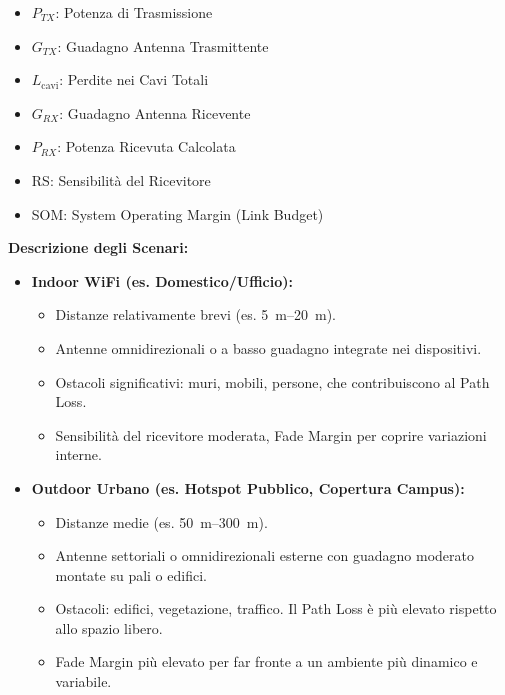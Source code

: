\begin{itemize}
    \item $P_{TX}$: Potenza di Trasmissione
    \item $G_{TX}$: Guadagno Antenna Trasmittente
    \item $L_{\text{cavi}}$: Perdite nei Cavi Totali
    \item $G_{RX}$: Guadagno Antenna Ricevente
    \item $P_{RX}$: Potenza Ricevuta Calcolata
    \item RS: Sensibilità del Ricevitore
    \item SOM: System Operating Margin (Link Budget)
\end{itemize}

\textbf{Descrizione degli Scenari:}
\begin{itemize}
    \item \textbf{Indoor WiFi (es. Domestico/Ufficio):}
    \begin{itemize}
        \item Distanze relativamente brevi (es. \SIrange{5}{20}{\meter}).
        \item Antenne omnidirezionali o a basso guadagno integrate nei dispositivi.
        \item Ostacoli significativi: muri, mobili, persone, che contribuiscono al Path Loss.
        \item Sensibilità del ricevitore moderata, Fade Margin per coprire variazioni interne.
    \end{itemize}
    
    \item \textbf{Outdoor Urbano (es. Hotspot Pubblico, Copertura Campus):}
    \begin{itemize}
        \item Distanze medie (es. \SIrange{50}{300}{\meter}).
        \item Antenne settoriali o omnidirezionali esterne con guadagno moderato montate su pali o edifici.
        \item Ostacoli: edifici, vegetazione, traffico. Il Path Loss è più elevato rispetto allo spazio libero.
        \item Fade Margin più elevato per far fronte a un ambiente più dinamico e variabile.
    \end{itemize}
    

\end{itemize}

